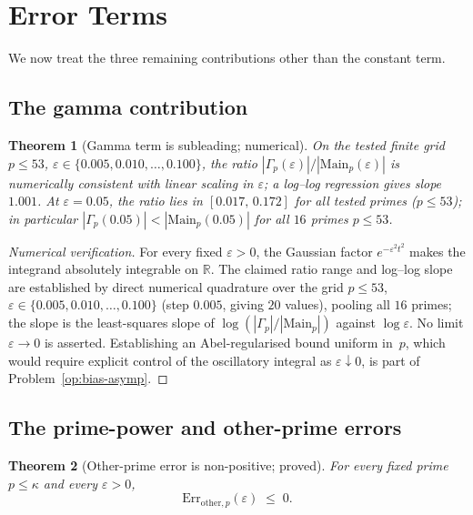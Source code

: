 \documentclass[11pt]{article}
\newtheorem{theorem}{Theorem}[section]
\begin{document}
\section{Error Terms}
\label{sec:errors}

We now treat the three remaining contributions other than the constant
term.

\subsection{The gamma contribution}

\begin{theorem}[Gamma term is subleading; numerical]
\label{thm:gamma}
On the tested finite grid
$p\le 53$, $\varepsilon\in\{0.005,0.010,\ldots,0.100\}$,
the ratio $|\Gamma_p(\varepsilon)|/|\mathrm{Main}_p(\varepsilon)|$
is numerically consistent with linear scaling in $\varepsilon$;
a log--log regression gives slope~$1.001$.
At $\varepsilon=0.05$, the ratio lies in $[0.017,\,0.172]$
for all tested primes ($p\le 53$); in particular
$|\Gamma_p(0.05)|<|\mathrm{Main}_p(0.05)|$ for all $16$ primes $p\le 53$.
\end{theorem}

\begin{proof}[Numerical verification]
For every fixed $\varepsilon>0$, the Gaussian factor $e^{-\varepsilon^2 t^2}$
makes the integrand absolutely integrable on $\mathbb{R}$.
The claimed ratio range and log--log slope are established by direct
numerical quadrature over the grid
$p\le 53$, $\varepsilon\in\{0.005,0.010,\ldots,0.100\}$
(step $0.005$, giving $20$ values), pooling all $16$ primes;
the slope is the least-squares slope of
$\log(|\Gamma_p|/|\mathrm{Main}_p|)$ against $\log\varepsilon$.
No limit $\varepsilon\to 0$
is asserted. Establishing an Abel-regularised bound uniform in~$p$,
which would require explicit control of the oscillatory integral
as $\varepsilon\downarrow 0$, is part of Problem~\ref{op:bias-asymp}.
\end{proof}

\subsection{The prime-power and other-prime errors}

\begin{theorem}[Other-prime error is non-positive; proved]
\label{thm:other}
For every fixed prime $p\le\kappa$ and every $\varepsilon>0$,
\[
\mathrm{Err}_{\mathrm{other},p}(\varepsilon) \;\le\; 0.
\]
\end{theorem}
\end{document}
